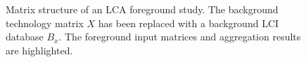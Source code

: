 \begin{figure}
  \begin{center}
    
    \caption{Matrix structure of an LCA foreground study.  The background technology matrix $X$ has been replaced with a background LCI database $B_x$.  The foreground input matrices and aggregation results are highlighted.}
    \label{fig:foreground}
  \end{center}
\end{figure}
